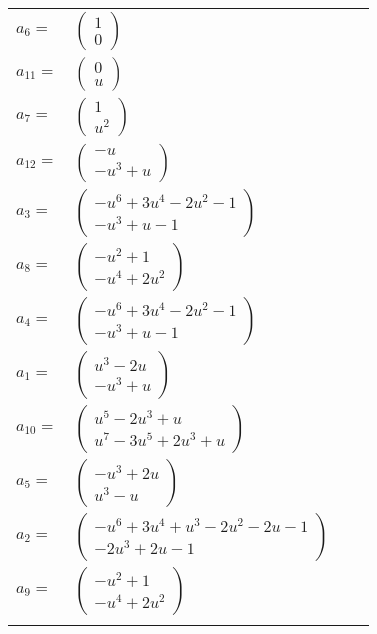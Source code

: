 \documentclass[1p]{elsarticle_modified}
\theoremstyle{definition}
\begin{document}
\begin{tabular}{m{7pt} m{180pt} m{7pt} m{180pt} }
\flushright $a_{6}=$&$\begin{pmatrix}1\\0\end{pmatrix}$ \\
\flushright $a_{11}=$&$\begin{pmatrix}0\\u\end{pmatrix}$ \\
\flushright $a_{7}=$&$\begin{pmatrix}1\\u^2\end{pmatrix}$ \\
\flushright $a_{12}=$&$\begin{pmatrix}- u\\- u^3+u\end{pmatrix}$ \\
\flushright $a_{3}=$&$\begin{pmatrix}- u^6+3 u^4-2 u^2-1\\- u^3+u-1\end{pmatrix}$ \\
\flushright $a_{8}=$&$\begin{pmatrix}- u^2+1\\- u^4+2 u^2\end{pmatrix}$ \\
\flushright $a_{4}=$&$\begin{pmatrix}- u^6+3 u^4-2 u^2-1\\- u^3+u-1\end{pmatrix}$ \\
\flushright $a_{1}=$&$\begin{pmatrix}u^3-2 u\\- u^3+u\end{pmatrix}$ \\
\flushright $a_{10}=$&$\begin{pmatrix}u^5-2 u^3+u\\u^7-3 u^5+2 u^3+u\end{pmatrix}$ \\
\flushright $a_{5}=$&$\begin{pmatrix}- u^3+2 u\\u^3- u\end{pmatrix}$ \\
\flushright $a_{2}=$&$\begin{pmatrix}- u^6+3 u^4+u^3-2 u^2-2 u-1\\-2 u^3+2 u-1\end{pmatrix}$ \\
\flushright $a_{9}=$&$\begin{pmatrix}- u^2+1\\- u^4+2 u^2\end{pmatrix}$\\&\end{tabular}
\end{document}
